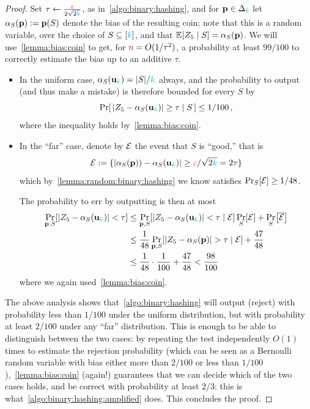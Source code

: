 \begin{proof}
Set $\tau \gets \frac{\textcolor{red}{\varepsilon}}{2\sqrt{2{\textcolor{cyan}{k}}}}$, as in~\cref{algo:binary:hashing}, and for $\mathbf{p}\in\Delta_{{\textcolor{cyan}{k}}}$ let $\alpha_S(\mathbf{p}):= \mathbf{p}(S)$ denote the bias of the resulting coin; note that this is a random variable, over the choice of $S\subseteq[{\textcolor{cyan}{k}}]$, and that $\bEEC{Z_5}{S} = \alpha_S(\p)$. We will use~\cref{lemma:bias:coin} to get, for ${\textcolor{purple}{n}} = O(1/\tau^2)$, a probability at least $99/100$ to correctly estimate the bias up to an additive $\tau$.
\begin{itemize}
    \item In the uniform case, $\alpha_S(\mathbf{u}_{\textcolor{cyan}{k}}) = |S|/{\textcolor{cyan}{k}}$ always, and the probability to output \reject (and thus make a mistake) is therefore bounded for every $S$ by
    \[
        \probaCond{ |Z_5 - \alpha_S(\uniform_\ab)| \geq \tau}{S}\leq 1/100\,,
    \]
    where the inequality holds by~\cref{lemma:bias:coin}.
    \item In the ``far'' case, denote by $\mathcal{E}$ the event that $S$ is ``good,'' that is
    \[
        \mathcal{E} := \{ |\alpha_S(\mathbf{p}))-\alpha_S(\mathbf{u}_{\textcolor{cyan}{k}})| \geq {\textcolor{red}{\ensuremath{\varepsilon}}}/{\sqrt{2{\textcolor{cyan}{k}}} = 2\tau}  \}
    \]
    which by~\cref{lemma:random:binary:hashing} we know satisfies $\bP{S}{\cE} \geq 1/48$.
    
    The probability to err by outputting \accept is then at most
    \begin{align*}
        \bP{\p,S}{|Z_5 - \alpha_S(\uniform_\ab)| < \tau}      
        &\leq \bP{\p,S}{|Z_5 - \alpha_S(\uniform_\ab)| < \tau \mid \cE}\bP{S}{\cE} + \bP{S}{\overline{\cE}} \\
        &\leq \frac{1}{48} \bP{\p,S}{|Z_5 - \alpha_S(\p)| > \tau \mid \cE} + \frac{47}{48} \\
        &\leq \frac{1}{48} \cdot \frac{1}{100} + \frac{47}{48}
        < \frac{98}{100}
    \end{align*}
    where we again used~\cref{lemma:bias:coin}.
  \end{itemize}
  The above analysis shows that~\cref{algo:binary:hashing} will output \reject (reject) with probability less than $1/100$ under the uniform distribution, but with probability at least $2/100$ under any ``far'' distribution. This is enough to be able to distinguish between the two cases: by repeating the test independently $O(1)$ times to estimate the rejection probability (which can be seen as a Bernoulli random variable with bias either more than $2/100$ or less than $1/100$),~\cref{lemma:bias:coin} (again!) guarantees that we can decide which of the two cases holds, and be correct with probability at least $2/3$: this is what~\cref{algo:binary:hashing:amplified} does. This concludes the proof.
\end{proof}
